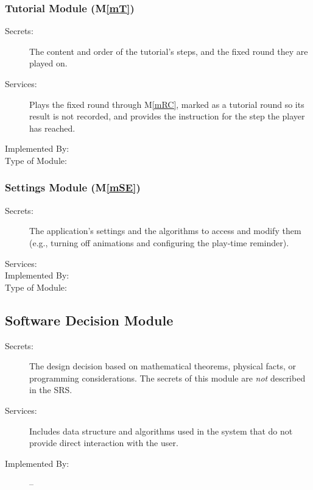 \documentclass[12pt, titlepage]{article}
\newcommand{\mref}[1]{M\ref{#1}}
\begin{document}
\subsubsection{Tutorial Module (\mref{mT})}

\begin{description}
\item[Secrets:] The content and order of the tutorial's steps, and the fixed round they are played on.
\item[Services:] Plays the fixed round through \mref{mRC}, marked as a tutorial round so its result is not recorded, and provides the instruction for the step the player has reached.
\item[Implemented By:]
\item[Type of Module:]
\end{description}

\subsubsection{Settings Module (\mref{mSE})}

\begin{description}
\item[Secrets:] The application's settings and the algorithms to access and modify them (e.g., turning off animations and configuring the play-time reminder).
\item[Services:]
\item[Implemented By:]
\item[Type of Module:]
\end{description}

\subsection{Software Decision Module}

\begin{description}
\item[Secrets:] The design decision based on mathematical theorems, physical
  facts, or programming considerations. The secrets of this module are
  \emph{not} described in the SRS.
\item[Services:] Includes data structure and algorithms used in the system that
  do not provide direct interaction with the user. 
\item[Implemented By:] --
\end{description}
\end{document}
